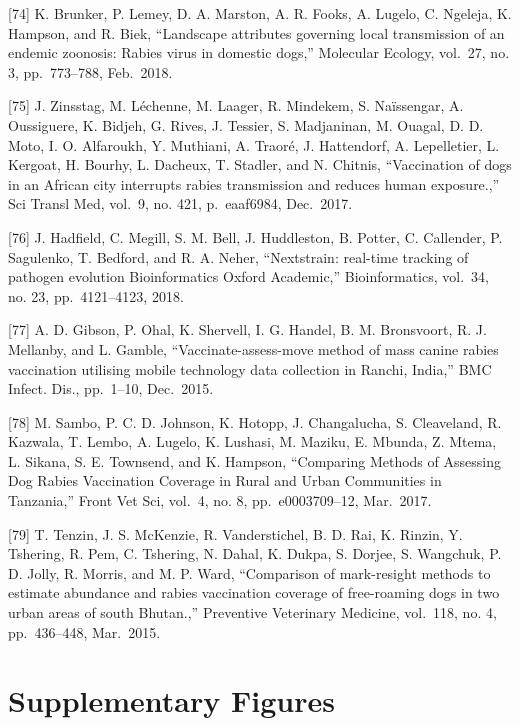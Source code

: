 \documentclass[
  oneside]{book}
\begin{document}
{[}74{]} K. Brunker, P. Lemey, D. A. Marston, A. R. Fooks, A. Lugelo, C. Ngeleja, K. Hampson, and R. Biek, ``Landscape attributes governing local transmission of an endemic zoonosis: Rabies virus in domestic dogs,'' Molecular Ecology, vol.~27, no. 3, pp.~773--788, Feb.~2018.

{[}75{]} J. Zinsstag, M. Léchenne, M. Laager, R. Mindekem, S. Naïssengar, A. Oussiguere, K. Bidjeh, G. Rives, J. Tessier, S. Madjaninan, M. Ouagal, D. D. Moto, I. O. Alfaroukh, Y. Muthiani, A. Traoré, J. Hattendorf, A. Lepelletier, L. Kergoat, H. Bourhy, L. Dacheux, T. Stadler, and N. Chitnis, ``Vaccination of dogs in an African city interrupts rabies transmission and reduces human exposure.,'' Sci Transl Med, vol.~9, no. 421, p.~eaaf6984, Dec.~2017.

{[}76{]} J. Hadfield, C. Megill, S. M. Bell, J. Huddleston, B. Potter, C. Callender, P. Sagulenko, T. Bedford, and R. A. Neher, ``Nextstrain: real-time tracking of pathogen evolution \textbar{} Bioinformatics \textbar{} Oxford Academic,'' Bioinformatics, vol.~34, no. 23, pp.~4121--4123, 2018.

{[}77{]} A. D. Gibson, P. Ohal, K. Shervell, I. G. Handel, B. M. Bronsvoort, R. J. Mellanby, and L. Gamble, ``Vaccinate-assess-move method of mass canine rabies vaccination utilising mobile technology data collection in Ranchi, India,'' BMC Infect. Dis., pp.~1--10, Dec.~2015.

{[}78{]} M. Sambo, P. C. D. Johnson, K. Hotopp, J. Changalucha, S. Cleaveland, R. Kazwala, T. Lembo, A. Lugelo, K. Lushasi, M. Maziku, E. Mbunda, Z. Mtema, L. Sikana, S. E. Townsend, and K. Hampson, ``Comparing Methods of Assessing Dog Rabies Vaccination Coverage in Rural and Urban Communities in Tanzania,'' Front Vet Sci, vol.~4, no. 8, pp.~e0003709--12, Mar.~2017.

{[}79{]} T. Tenzin, J. S. McKenzie, R. Vanderstichel, B. D. Rai, K. Rinzin, Y. Tshering, R. Pem, C. Tshering, N. Dahal, K. Dukpa, S. Dorjee, S. Wangchuk, P. D. Jolly, R. Morris, and M. P. Ward, ``Comparison of mark-resight methods to estimate abundance and rabies vaccination coverage of free-roaming dogs in two urban areas of south Bhutan.,'' Preventive Veterinary Medicine, vol.~118, no. 4, pp.~436--448, Mar.~2015.

\hypertarget{supplementary-figures}{%
\section{Supplementary Figures}\label{supplementary-figures}}
\end{document}
